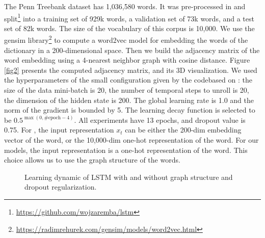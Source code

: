 \documentclass{article}
\begin{document}
The Penn Treebank dataset has 1,036,580 words. It was pre-processed in \cite{zaremba2014recurrent} and split\footnote{\url{https://github.com/wojzaremba/lstm}} into a training set of 929k words, a validation set of 73k words, and a test set of 82k words. The size of the vocabulary of this corpus is 10,000. We use the gensim library\footnote{\url{https://radimrehurek.com/gensim/models/word2vec.html}} to compute a word2vec model \citep{word2vec} for embedding the words of the dictionary in a 200-dimensional space. Then we build the adjacency matrix of the word embedding using a 4-nearest neighbor graph with cosine distance. Figure \ref{fig2} presents the computed adjacency matrix, and its 3D visualization. We used the hyperparameters of the small configuration given by the code\footnotemark[6] based on \cite{zaremba2014recurrent}: the size of the data mini-batch is 20, the number of temporal steps to unroll is 20, the dimension of the hidden state is 200. The global learning rate is 1.0 and the norm of the gradient is bounded by 5. The learning decay function is selected to be $0.5^{\max(0,\textrm{\#epoch}-4)}$. All experiments have 13 epochs, and dropout value is 0.75. For \cite{zaremba2014recurrent}, the input representation $x_t$ can be either the 200-dim embedding vector of the word, or the 10,000-dim one-hot representation of the word. For our models, the input representation is a one-hot representation of the word. This choice allows us to use the graph structure of the words.

\begin{figure}[t]
	\centering
	\hfill
		\caption{Learning dynamic of LSTM with and without graph structure and dropout regularization.}
	\label{fig3}
\end{figure}
\end{document}
